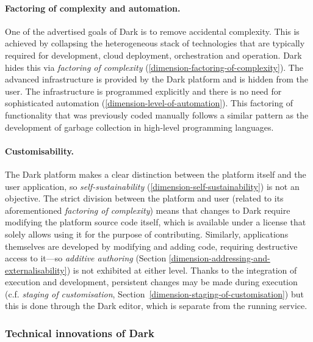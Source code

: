 \documentclass[ twoside,openright,titlepage,numbers=noenddot,headinclude,footinclude,cleardoublepage=empty,abstract=on,
                BCOR=5mm,paper=a4,fontsize=11pt
                ]{scrreprt}
\theoremstyle{definition}
\begin{document}
\paragraph{Factoring of complexity and automation.}

One of the advertised goals of Dark is to remove accidental complexity.
This is achieved by collapsing the heterogeneous stack of technologies
that are typically required for development, cloud deployment,
orchestration and operation. Dark hides this via \emph{factoring of
complexity} (\ref{dimension-factoring-of-complexity}). The advanced
infrastructure is provided by the Dark platform and is hidden from the
user. The infrastructure is programmed explicitly and there is no need
for sophisticated automation (\ref{dimension-level-of-automation}). This
factoring of functionality that was previously coded manually follows a
similar pattern as the development of garbage collection in high-level
programming languages.

\paragraph{Customisability.}

The Dark platform makes a clear distinction between the platform itself
and the user application, so \emph{self-sustainability}
(\ref{dimension-self-sustainability}) is not an objective. The strict
division between the platform and user (related to its aforementioned
\emph{factoring of complexity}) means that changes to Dark require
modifying the platform source code itself, which is available under a
license that solely allows using it for the purpose of contributing.
Similarly, applications themselves are developed by modifying and adding
code, requiring destructive access to it---so \emph{additive authoring}
(Section \ref{dimension-addressing-and-externalisability}) is not
exhibited at either level. Thanks to the integration of execution and
development, persistent changes may be made during execution (c.f.
\emph{staging of customisation},
Section~\ref{dimension-staging-of-customisation}) but this is done
through the Dark editor, which is separate from the running service.

\hypertarget{technical-innovations-of-dark}{\subsubsection{Technical innovations of
Dark}\label{technical-innovations-of-dark}}
\end{document}

